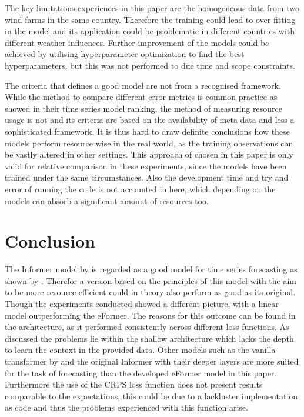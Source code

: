 \documentclass{article}
\begin{document}
The key limitations experiences in this paper are the homogeneous data from two wind farms in the same country. Therefore the training could lead to over fitting in the model and its application could be problematic in different countries with different weather influences. Further improvement of the models could be achieved by utilising hyperparameter optimization to find the best hyperparameters, but this was not performed to due time and scope constraints. 

The criteria that defines a good model are not from a recognised framework. While the method to compare different error metrics is common practice as \cite{TS-ranking} showed in their time series model ranking, the method of measuring resource usage is not and its criteria are based on the availability of meta data and less a sophisticated framework. It is thus hard to draw definite conclusions how these models perform resource wise in the real world, as the training observations can be vastly altered in other settings. This approach of chosen in this paper is only valid for relative comparison in these experiments, since the models have been trained under the same circumstances. Also the development time and try and error of running the code is not accounted in here, which depending on the models can absorb a significant amount of resources too. 

\section{Conclusion}

The Informer model by \cite{Informer} is regarded as a good model for time series forecasting as shown by \cite{TS-ranking}. Therefor a version based on the principles of this model with the aim to be more resource efficient could in theory also perform as good as its original. Though the experiments conducted showed a different picture, with a linear model outperforming the eFormer. The reasons for this outcome can be found in the architecture, as it performed consistently across different loss functions. As discussed the problems lie within the shallow architecture which lacks the depth to learn the context in the provided data. Other models such as the vanilla transformer by \cite{vanilla-transformer} and the original Informer with their deeper layers are more suited for the task of forecasting than the developed eFormer model in this paper. Furthermore the use of the CRPS loss function does not present results comparable to the expectations, this could be due to a lackluster implementation as code and thus the problems experienced with this function arise. 


\newpage

\printbibliography
\end{document}
